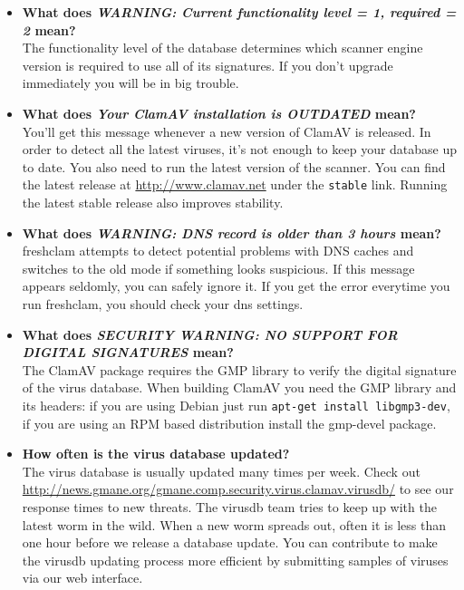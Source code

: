 \documentclass[a4paper,titlepage,12pt]{article}
\begin{document}
    \begin{itemize}
	\item \textbf{What does \emph{WARNING: Current functionality level = 1,
	required = 2} mean?}\\
	The functionality level of the database determines which scanner engine
	version is required to use all of its signatures. If you don't upgrade
	immediately you will be in big trouble.

	\item \textbf{What does \emph{Your ClamAV installation is OUTDATED}
	mean?}\\
	You'll get this message whenever a new version of ClamAV is released.
	In order to detect all the latest viruses, it's not enough to keep your
	database up to date. You also need to run the latest version of the
	scanner. You can find the latest release at \url{http://www.clamav.net}
	under the \verb+stable+ link. Running the latest stable release also
	improves stability.

	\item \textbf{What does \emph{WARNING: DNS record is older than 3 hours}
	mean?}\\
	freshclam attempts to detect potential problems with DNS caches and
	switches to the old mode if something looks suspicious. If this message
	appears seldomly, you can safely ignore it. If you get the error
	everytime you run freshclam, you should check your dns settings.

	\item \textbf{What does \emph{SECURITY WARNING: NO SUPPORT FOR DIGITAL
	SIGNATURES} mean?}\\
	The ClamAV package requires the GMP library to verify the digital
	signature of the virus database. When building ClamAV you need the
	GMP library and its headers: if you are using Debian just run
	\verb+apt-get install libgmp3-dev+, if you are using an RPM based
	distribution install the gmp-devel package.

	\item \textbf{How often is the virus database updated?}\\
	The virus database is usually updated many times per week. Check out
	\url{http://news.gmane.org/gmane.comp.security.virus.clamav.virusdb/}
	to see our response times to new threats. The virusdb team tries to
	keep up with the latest worm in the wild. When a new worm spreads out,
	often it is less than one hour before we release a database update.
	You can contribute to make the virusdb updating process more efficient
	by submitting samples of viruses via our web interface.


\end{itemize}
\end{document}
